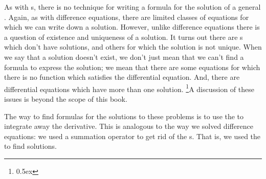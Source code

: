 As with s, there is no technique for writing 
a formula for the solution of a general .
Again, as with difference equations, there are limited classes 
of equations for which we can write down a solution. However, unlike difference 
equations there is a question of existence and uniqueness of 
a solution. It turns out there are s 
which don't have solutions, and others for which the solution 
is not unique. When we say that a solution doesn't exist, we don't 
just mean that we can't find a formula to express the solution; 
we mean that there are some equations for which there is no 
function which satisfies the differential equation. And, there are differential equations which have more than 
one solution.%
\footnote{\kern 0.5pt \raise 0.5ex \hbox{\dag}}{A discussion of these issues is beyond the scope of this book.}

The way to find formulas for the solutions to these problems is 
to use the  to integrate away the 
derivative. This is analogous to the way we solved difference equations:
we used a summation operator to get rid of the s. 
That is, we used the  to find solutions.

